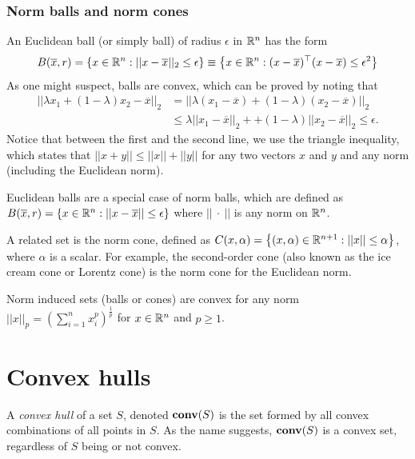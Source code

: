 \subsubsection{Norm balls and norm cones}

An Euclidean ball (or simply ball) of radius $\epsilon$ in $\mathbb{R}^n$ has the form
%
\begin{equation*}
	B(\overline{x}, r) = \left\{ x \in \mathbb{R}^n : || x - \overline{x}||_2 \le \epsilon \right \} \equiv \left\{ x \in \mathbb{R}^n : (x - \overline{x})^\top (x - \overline{x}) \le \epsilon^2 \right \}
\end{equation*}
%
As one might suspect, balls are convex, which can be proved by noting that
%
\begin{align*}
	||\lambda x_1 + (1 - \lambda) x_2 - \overline{x}||_2  & = ||\lambda (x_1 - \overline{x}) + (1 - \lambda) (x_2 - \overline{x})||_2 \\
	& \le \lambda ||x_1 - \overline{x}||_2 + + (1 - \lambda) ||x_2 - \overline{x}||_2 \le \epsilon.
\end{align*}
%
Notice that between the first and the second line, we use the triangle inequality, which states that $||x + y|| \le ||x|| + ||y||$ for any two vectors $x$ and $y$ and any norm (including the Euclidean norm). 

Euclidean balls are a special case of norm balls, which are defined as $B(\overline{x}, r) = \left\{ x \in \mathbb{R}^n : || x - \overline{x}|| \le \epsilon \right \}$ where $||\ \cdot \ ||$ is any norm on $\mathbb{R}^n$. 

A related set is the norm cone, defined as $C(x, \alpha) = \left\{ (x,\alpha) \in \mathbb{R}^{n+1} : ||x|| \le \alpha \right \}$, where $\alpha$ is a scalar. For example, the second-order cone (also known as the ice cream cone or Lorentz cone) is the norm cone for the Euclidean norm.

\begin{remark} 
	Norm induced sets (balls or cones) are convex for any norm $||x||_p = \left(\sum_{i=1}^n x_i^p\right)^{\frac{1}{p}}$ for $x \in \mathbb{R}^n$ and $p \geq 1$.
\end{remark}


\section{Convex hulls} 

A \emph{convex hull} of a set $S$, denoted $\mathop{\bf conv}(S)$ is the set formed by all convex combinations of all points in $S$. As the name suggests, $\mathop{\bf conv}(S)$ is a convex set, regardless of $S$ being or not convex. 

